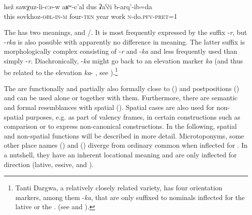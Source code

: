 \begin{exe}
	\ex	\label{ex:In the sovkhoz I worked for 40 years}
	\gll	hež	sawχuz-li-cːe-w	aʁʷ-c'al	dus	ʡaˁči	b-arq'-ib=da \\
		this	sovkhoz-\textsc{obl}-\textsc{in}-\textsc{m}	four-\textsc{ten}	year	work	\textsc{n}-do.\textsc{pfv}-\textsc{pret}=1\\
	\glt	{}
\end{exe} 

The  has two meanings,  and \slash{}. It is most frequently expressed by the suffix -\textit{r}, but -\textit{rka} is also possible with apparently no difference in meaning. The latter suffix is morphologically complex consisting of -\textit{r} and -\textit{ka} and less frequently used than simply -\textit{r}. Diachronically, -\textit{ka} might go back to an elevation marker \textit{ka}  (and thus be related to the elevation  \textit{ka}- , see ).\footnote{Tanti Dargwa, a relatively closely related variety, has four orientation markers, among them -\textit{ka}, that are only suffixed to nominals inflected for the lative or the . (see \citealp[69]{Sumbatova.Lander2014} and \citet{ForkerLTSanzhi}).} 

The  are functionally and partially also formally close to  () and postpositions () and can be used alone or together with them. Furthermore, there are semantic and formal resemblances with spatial  (). Spatial cases are also used for non-spatial purposes, e.g. as part of valency frames, in certain constructions such as comparison or to express non-canonical  constructions. In the following, spatial and non-spatial functions will be described in more detail. Microtoponyms, some other place names () and  () diverge from ordinary common  when inflected for . In a nutshell, they have an inherent locational meaning and are only inflected for direction (lative, essive, and ).



